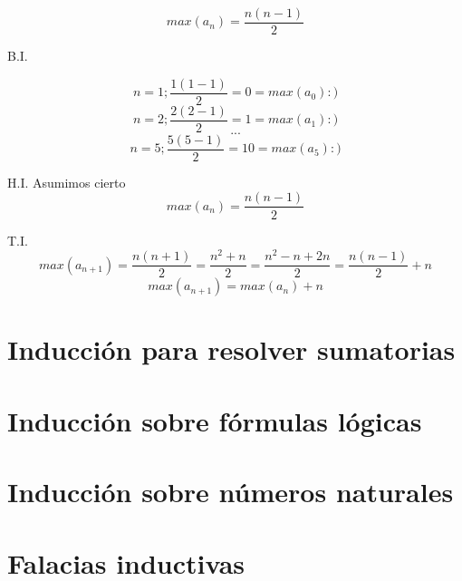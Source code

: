 \documentclass{article}
\begin{document}
\[ max(a_n) = \frac{n(n-1)}{2} \]

B.I.

\[n = 1; \frac{1(1-1)}{2} = 0 = max(a_0) :)\]
\[n = 2; \frac{2(2-1)}{2} = 1 = max(a_1) :)\]
\[...\]
\[n = 5; \frac{5(5-1)}{2} = 10 = max(a_5) :)\]

H.I.
Asumimos cierto 
\[ max(a_n) = \frac{n(n-1)}{2} \]

T.I.
\[ max(a_{n+1}) = \frac{n(n+1)}{2} = \frac{n^2+n}{2} = \frac{n^2-n + 2n}{2} = \frac{n(n-1)}{2} + n \]
\[ max(a_{n+1}) = max(a_n) + n \]



\section{Inducción para resolver sumatorias}

\section{Inducción sobre fórmulas lógicas}

\section{Inducción sobre números naturales}

\section{Falacias inductivas}
\end{document}
